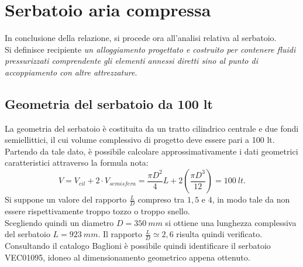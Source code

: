 \section{Serbatoio aria compressa}
In conclusione della relazione, si procede ora all'analisi relativa al serbatoio.\\
Si definisce recipiente \emph{un alloggiamento progettato e costruito per contenere fluidi pressurizzati comprendente gli elementi annessi diretti sino al punto di accoppiamento con altre attrezzature}.
\subsection{Geometria del serbatoio da 100 lt} 
La geometria del serbatoio è costituita da un tratto cilindrico centrale e due fondi semiellittici, il cui volume complessivo di progetto deve essere pari a 100 lt.\\
Partendo da tale dato, è possibile calcolare approssimativamente i dati geometrici caratteristici attraverso la formula nota:
\begin{equation}
    V=V_{cil}+2\cdot V_{semisfera}=\frac{\pi D^2}{4}L+2\left(\frac{\pi D^3}{12}\right)=100\ lt. 
\end{equation}
Si suppone un valore del rapporto $\frac{L}{D}$ compreso tra $1,5$ e $4$, in modo tale da non essere rispettivamente troppo tozzo o troppo snello.\\ 
Scegliendo quindi un diametro $D=350\ mm$ si ottiene una lunghezza complessiva del serbatoio $L=923\ mm$. Il rapporto $\frac{L}{D}\simeq 2,6$ risulta quindi verificato.\\
Consultando il catalogo Baglioni è possibile quindi identificare il serbatoio VEC01095, idoneo al dimensionamento geometrico appena ottenuto.
